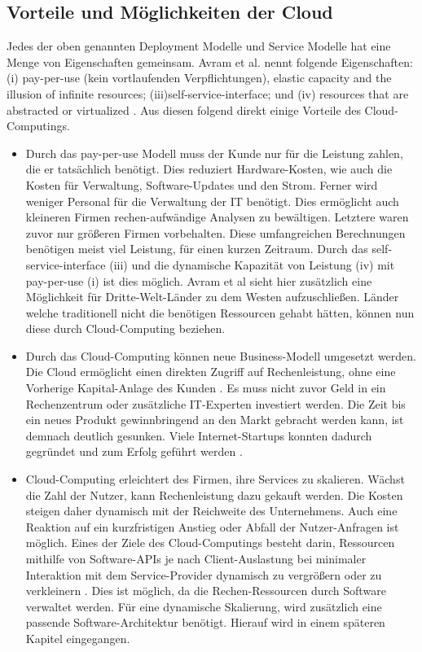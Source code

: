 \subsection{Vorteile und Möglichkeiten der Cloud}
Jedes der oben genannten Deployment Modelle und Service Modelle hat eine Menge von Eigenschaften gemeinsam. Avram et al. nennt folgende Eigenschaften: (i) pay-per-use (kein vortlaufenden Verpflichtungen), elastic capacity and the illusion of infinite resources; (iii)self-service-interface; und (iv) resources that are abstracted or virtualized \cite{avram_advantages_2014}. Aus diesen folgend direkt einige Vorteile des Cloud-Computings.
\begin{itemize}
  \item Durch das pay-per-use Modell muss der Kunde nur für die Leistung zahlen, die er tatsächlich benötigt. Dies reduziert Hardware-Kosten, wie auch die Kosten für Verwaltung, Software-Updates und den Strom. Ferner wird weniger Personal für die Verwaltung der IT benötigt. Dies ermöglicht auch kleineren Firmen rechen-aufwändige Analysen zu bewältigen. Letztere waren zuvor nur größeren Firmen vorbehalten. Diese umfangreichen Berechnungen benötigen meist viel Leistung, für einen kurzen Zeitraum. Durch das self-service-interface (iii) und die dynamische Kapazität von Leistung (iv) mit pay-per-use (i) ist dies möglich. Avram et al \cite{avram_advantages_2014} sieht hier zusätzlich eine Möglichkeit für Dritte-Welt-Länder zu dem Westen aufzuschließen. Länder welche traditionell nicht die benötigen Ressourcen gehabt hätten, können nun diese durch Cloud-Computing beziehen.  
  \item Durch das Cloud-Computing können neue Business-Modell umgesetzt werden. Die Cloud ermöglicht einen direkten Zugriff auf Rechenleistung, ohne eine Vorherige Kapital-Anlage des Kunden \cite{noauthor_premise_2020}. Es muss nicht zuvor Geld in ein Rechenzentrum oder zusätzliche IT-Experten investiert werden. Die Zeit bis ein neues Produkt gewinnbringend an den Markt gebracht werden kann, ist demnach deutlich gesunken. Viele Internet-Startups konnten dadurch gegründet und zum Erfolg geführt werden \cite{avram_advantages_2014}. 
  \item Cloud-Computing erleichtert des Firmen, ihre Services zu skalieren. Wächst die Zahl der Nutzer, kann Rechenleistung dazu gekauft werden. Die Kosten steigen daher dynamisch mit der Reichweite des Unternehmens. Auch eine Reaktion auf ein kurzfristigen Anstieg oder Abfall der Nutzer-Anfragen ist möglich. Eines der Ziele des Cloud-Computings besteht darin, Ressourcen mithilfe von Software-APIs je nach Client-Auslastung bei minimaler Interaktion mit dem Service-Provider dynamisch zu vergrößern oder zu verkleinern \cite{avram_advantages_2014}. Dies ist möglich, da die Rechen-Ressourcen durch Software verwaltet werden. Für eine dynamische Skalierung, wird zusätzlich eine passende Software-Architektur benötigt. Hierauf wird in einem späteren Kapitel eingegangen.

\end{itemize}
